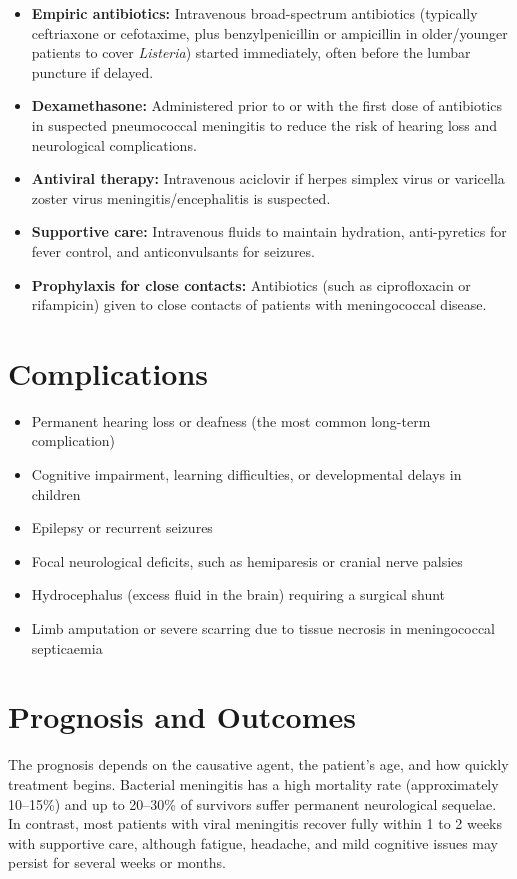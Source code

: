 \begin{itemize}
    \item \textbf{Empiric antibiotics:} Intravenous broad-spectrum antibiotics (typically ceftriaxone or cefotaxime, plus benzylpenicillin or ampicillin in older/younger patients to cover \textit{Listeria}) started immediately, often before the lumbar puncture if delayed.
    \item \textbf{Dexamethasone:} Administered prior to or with the first dose of antibiotics in suspected pneumococcal meningitis to reduce the risk of hearing loss and neurological complications.
    \item \textbf{Antiviral therapy:} Intravenous aciclovir if herpes simplex virus or varicella zoster virus meningitis/encephalitis is suspected.
    \item \textbf{Supportive care:} Intravenous fluids to maintain hydration, anti-pyretics for fever control, and anticonvulsants for seizures.
    \item \textbf{Prophylaxis for close contacts:} Antibiotics (such as ciprofloxacin or rifampicin) given to close contacts of patients with meningococcal disease.
\end{itemize}

\section*{Complications}
\begin{itemize}
    \item Permanent hearing loss or deafness (the most common long-term complication)
    \item Cognitive impairment, learning difficulties, or developmental delays in children
    \item Epilepsy or recurrent seizures
    \item Focal neurological deficits, such as hemiparesis or cranial nerve palsies
    \item Hydrocephalus (excess fluid in the brain) requiring a surgical shunt
    \item Limb amputation or severe scarring due to tissue necrosis in meningococcal septicaemia
\end{itemize}

\section*{Prognosis and Outcomes}
The prognosis depends on the causative agent, the patient's age, and how quickly treatment begins. Bacterial meningitis has a high mortality rate (approximately 10--15\%) and up to 20--30\% of survivors suffer permanent neurological sequelae. In contrast, most patients with viral meningitis recover fully within 1 to 2 weeks with supportive care, although fatigue, headache, and mild cognitive issues may persist for several weeks or months.

